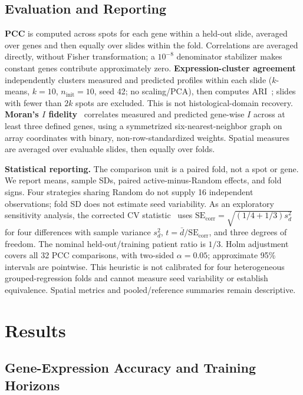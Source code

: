 \subsection{Evaluation and Reporting}
\label{sec:evaluation}

\textbf{PCC} is computed across spots for each gene within a held-out slide, averaged over genes and then equally over slides within the fold. Correlations are averaged directly, without Fisher transformation; a $10^{-8}$ denominator stabilizer makes constant genes contribute approximately zero. \textbf{Expression-cluster agreement} independently clusters measured and predicted profiles within each slide ($k$-means, $k=10$, $n_{\mathrm{init}}=10$, seed 42; no scaling/PCA), then computes ARI~\cite{hubert1985comparing}; slides with fewer than $2k$ spots are excluded. This is not histological-domain recovery. \textbf{Moran's $I$ fidelity}~\cite{moran1950notes} correlates measured and predicted gene-wise $I$ across at least three defined genes, using a symmetrized six-nearest-neighbor graph on array coordinates with binary, non-row-standardized weights. Spatial measures are averaged over evaluable slides, then equally over folds.

\textbf{Statistical reporting.} The comparison unit is a paired fold, not a spot or gene. We report means, sample SDs, paired active-minus-Random effects, and fold signs. Four strategies sharing Random do not supply 16 independent observations; fold SD does not estimate seed variability. As an exploratory sensitivity analysis, the corrected CV statistic~\cite{bouckaert2004replicability} uses $\mathrm{SE}_{\mathrm{corr}}=\sqrt{(1/4+1/3)s_d^2}$ for four differences with sample variance $s_d^2$, $t=\bar d/\mathrm{SE}_{\mathrm{corr}}$, and three degrees of freedom. The nominal held-out/training patient ratio is $1/3$. Holm adjustment~\cite{holm1979simple} covers all 32 PCC comparisons, with two-sided $\alpha=0.05$; approximate 95\% intervals are pointwise. This heuristic is not calibrated for four heterogeneous grouped-regression folds and cannot measure seed variability or establish equivalence. Spatial metrics and pooled/reference summaries remain descriptive.

\section{Results}
\label{sec:results}
\subsection{Gene-Expression Accuracy and Training Horizons}

